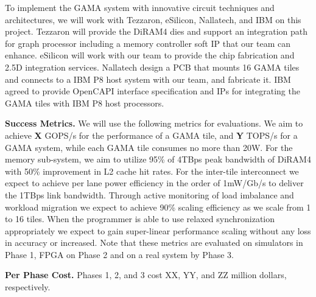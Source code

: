 

To implement the GAMA system with innovative circuit techniques and architectures, 
we will work with Tezzaron, eSilicon, Nallatech, and IBM on this project. 
Tezzaron will provide the DiRAM4 dies and support an integration path for graph processor including a memory controller soft IP that our team can enhance.
eSilicon will work with our team to provide the chip fabrication and 2.5D integration services.
Nallatech design a PCB that mounts 16 GAMA tiles and connects to a IBM P8 host system with our team, and fabricate it.
IBM agreed to provide OpenCAPI interface specification and IPs for integrating the GAMA tiles with IBM P8 host processors. 

\vspace{3pt}
\noindent
\textbf{Success Metrics.} 
We will use the following metrics for evaluations.
We aim to achieve \textbf{X} GOPS/s for the performance of a GAMA tile, and \textbf{Y} TOPS/s for a GAMA system, while
each GAMA tile consumes no more than 20W.
For the memory sub-system, we aim to utilize 95\% of 4TBps peak bandwidth of DiRAM4 with 50\% improvement in L2 cache hit rates.
For the inter-tile interconnect we expect to achieve per lane power efficiency in the order of 1mW/Gb/s to deliver the 1TBps link bandwidth. %
Through active monitoring of load imbalance and workload migration we expect to achieve 90\% scaling efficiency as we scale from 1 to 16 tiles. 
When the programmer is able to use relaxed synchronization appropriately we expect to gain super-linear performance scaling without any loss in accuracy or increased.  
Note that these metrics are evaluated on simulators in Phase 1, FPGA on Phase 2 and on a real system by Phase 3.  


\vspace{3pt}
\noindent
\textbf{Per Phase Cost.} 
Phases 1, 2, and 3 cost XX, YY, and ZZ million dollars, respectively.

